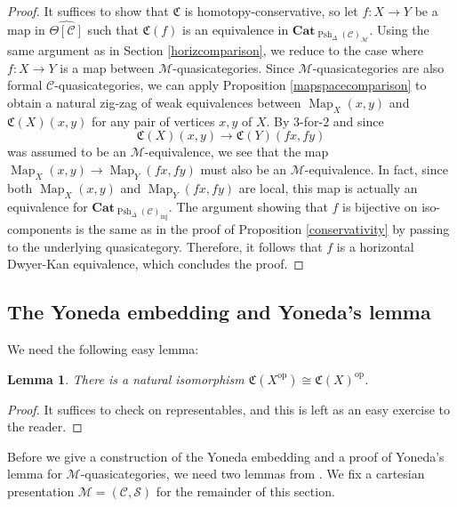\documentclass[leqno]{article}
\numberwithin{equation}{subsection}
\theoremstyle{plain}   %
\newtheorem{lemma}[equation]{Lemma}
\theoremstyle{remark}
\theoremstyle{plain}
\newcommand{\op}{\ensuremath{\mathrm{op}}}
\newcommand{\Cat}{\ensuremath{\mathbf{Cat}}}
\DeclareMathOperator{\Map}{Map}
\renewcommand{\C}{\ensuremath{\mathcal{C}}}
\newcommand{\M}{\ensuremath{\mathcal{M}}}
\newcommand{\setS}{\ensuremath{\mathscr{S}}}
\newcommand{\cellset}{\ensuremath{\widehat{\Theta[\mathcal{C}]}}}
\newcommand{\spsh}{\ensuremath{\operatorname{Psh}_\Delta(\mathcal{C})}}
\begin{document}
\begin{proof} It suffices to show that \(\mathfrak{C}\) is homotopy-conservative, so let \(f:X\to Y\) be a map in \(\cellset\) such that \(\mathfrak{C}(f)\) is an equivalence in \(\Cat_{\spsh_{\M}}\). Using the same argument as in Section \ref{horizcomparison}, we reduce to the case where \(f:X\to Y\) is a map between \(\M\)-quasicategories.  Since \(\M\)-quasicategories are also formal \(\C\)-quasicategories, we can apply Proposition \ref{mapspacecomparison} to obtain a natural zig-zag of weak equivalences between \(\Map_X(x,y)\) and \(\mathfrak{C}(X)(x,y)\) for any pair of vertices \(x,y\) of \(X\).  By \(3\)-for-\(2\) and since \[\mathfrak{C}(X)(x,y) \to \mathfrak{C}(Y)(fx,fy)\] was assumed to be an \(\M\)-equivalence, we see that the map \(\Map_X(x,y)\to \Map_Y(fx,fy)\) must also be an \(\M\)-equivalence.  In fact, since both \(\Map_X(x,y)\) and \(\Map_Y(fx,fy)\) are local, this map is actually an equivalence for \(\Cat_{\spsh_{\mathrm{inj}}}\).  The argument showing that \(f\) is bijective on iso-components is the same as in the proof of Proposition \ref{conservativity} by passing to the underlying quasicategory.  Therefore, it follows that \(f\) is a horizontal Dwyer-Kan equivalence, which concludes the proof.
\end{proof}
\subsection{The Yoneda embedding and Yoneda's lemma}
We need the following easy lemma:
\begin{lemma} There is a natural isomorphism \(\mathfrak{C}(X^\op)\cong \mathfrak{C}(X)^\op\).  
\end{lemma} 
\begin{proof}
	It suffices to check on representables, and this is left as an easy exercise to the reader.
\end{proof}
Before we give a construction of the Yoneda embedding and a proof of Yoneda's lemma for \(\M\)-quasicategories, we need two lemmas from \cite{htt}.   We fix a cartesian presentation \(\mathcal{M}=(\C,\setS)\) for the remainder of this section.
\end{document}
